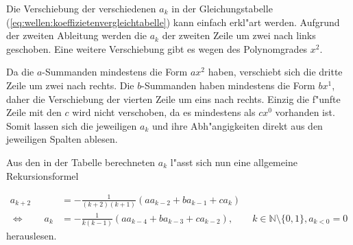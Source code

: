Die Verschiebung der verschiedenen $a_k$ in der Gleichungstabelle 
(\ref{eq:wellen:koeffizietenvergleichtabelle}) kann einfach erkl"art werden. 
Aufgrund der zweiten Ableitung werden die $a_k$ der zweiten Zeile um zwei nach 
links geschoben. Eine weitere Verschiebung gibt es wegen des Polynomgrades 
$x^2$.

Da die $a$-Summanden mindestens die Form $ax^2$ haben, verschiebt sich die 
dritte Zeile um zwei nach rechts. Die $b$-Summanden haben mindestens die Form 
$bx^1$, daher die Verschiebung der vierten Zeile um eins nach rechts. Einzig 
die f"unfte Zeile mit den $c$ wird nicht verschoben, da es mindestens als 
$cx^0$ vorhanden ist. Somit lassen sich die jeweiligen $a_k$ und ihre 
Abh"angigkeiten direkt aus den jeweiligen Spalten ablesen.

Aus den in der Tabelle berechneten $a_k$ l"asst sich nun eine allgemeine 
Rekursionsformel

\begin{equation*}
	\begin{split}
		a_{k+2} &= -\frac{1}{(k+2)(k+1)} (aa_{k-2}+ba_{k-1}+ca_k) \\
		\Leftrightarrow \qquad
		a_k &= -\frac{1}{k(k-1)} (aa_{k-4}+ba_{k-3}+ca_{k-2}), \qquad k \in 
		\mathbb{N} \setminus \{0, 1\}, a_{k<0} = 0
	\end{split}
\end{equation*}
herauslesen.
